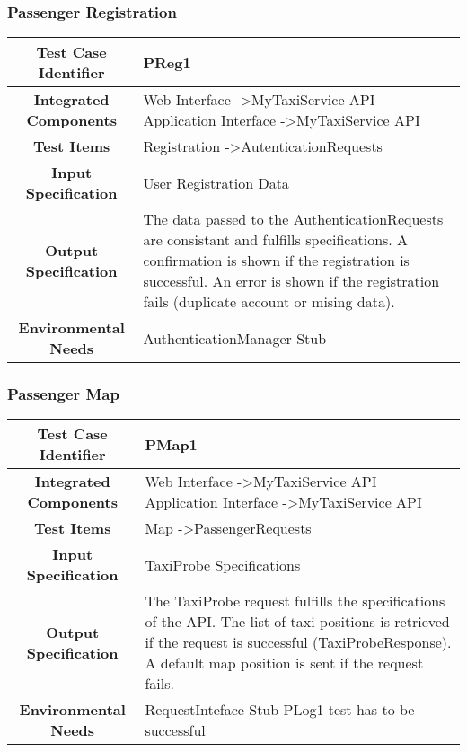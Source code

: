 \documentclass[11pt, a4paper,titlepage]{article}
\begin{document}
	\subsubsection{Passenger Registration}
	\begin{tabularx}{\textwidth}{| c|X|}
		\hline \textbf{Test Case Identifier} & PReg1 \\
		\hline \textbf{Integrated Components} &  Web Interface -\textgreater MyTaxiService API \newline 
		Application Interface -\textgreater MyTaxiService API \\
		\hline \textbf{Test Items} & Registration -\textgreater AutenticationRequests \\
		\hline \textbf{Input Specification} & User Registration Data \\
		\hline \textbf{Output Specification} & 
		The data passed to the AuthenticationRequests are consistant and fulfills specifications.\newline
		A confirmation is shown if the registration is successful.\newline
		An error is shown if the registration fails (duplicate account or mising data). \\
		\hline \textbf{Environmental Needs} & AuthenticationManager Stub \\
		\hline
	\end{tabularx}
	\newline
	\newline
	\subsubsection{Passenger Map}
	\begin{tabularx}{\textwidth}{| c|X|}
		\hline \textbf{Test Case Identifier} & PMap1 \\
		\hline \textbf{Integrated Components} &  Web Interface -\textgreater MyTaxiService API \newline 
		Application Interface -\textgreater MyTaxiService API \\
		\hline \textbf{Test Items} & Map -\textgreater PassengerRequests \\
		\hline \textbf{Input Specification} & TaxiProbe Specifications \\
		\hline \textbf{Output Specification} & 
		The TaxiProbe request fulfills the specifications of the API.\newline	
		The list of taxi positions is retrieved if the request is successful (TaxiProbeResponse).\newline
		A default map position is sent if the request fails.  \\
		\hline \textbf{Environmental Needs} & RequestInteface Stub \newline PLog1 test has to be successful \\
		\hline
	\end{tabularx}
	\newline
	\newline
\end{document}

